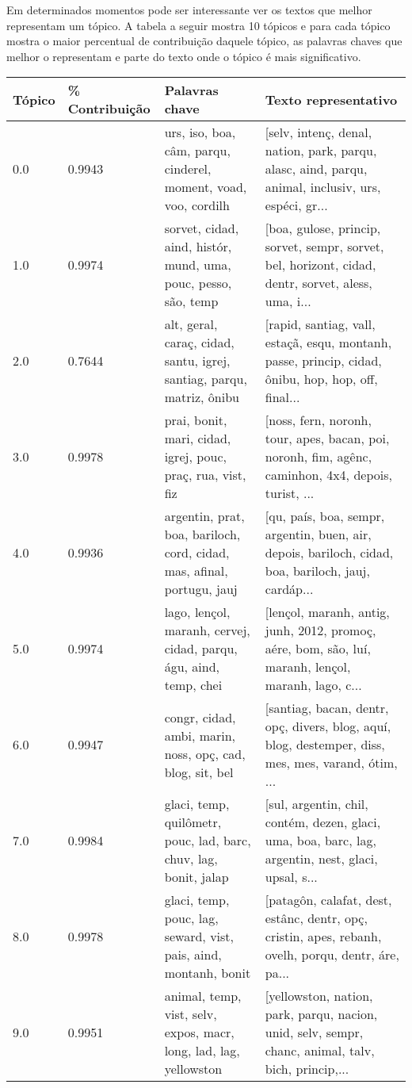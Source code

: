 Em determinados momentos pode ser interessante ver os textos que melhor representam um tópico. A tabela a seguir mostra 10 tópicos e para cada tópico 
mostra o maior percentual de contribuição daquele tópico, as palavras chaves que melhor o representam e parte do texto onde o tópico
é mais significativo.

\begin{center}
    \begin{tabular}{| m{5em} | m{6em} | m{10em} | m{10em} |}
        \hline
        Tópico & \% Contribuição & Palavras chave & Texto representativo \\
        \hline
        0.0 & 0.9943 & urs, iso, boa, câm, parqu, cinderel, moment, voad, voo, cordilh & [selv, intenç, denal, nation, park, parqu, alasc, aind, parqu, animal, inclusiv, urs, espéci, gr... \\
        \hline
        1.0 & 0.9974 & sorvet, cidad, aind, histór, mund, uma, pouc, pesso, são, temp & [boa, gulose, princip, sorvet, sempr, sorvet, bel, horizont, cidad, dentr, sorvet, aless, uma, i... \\
        \hline
        2.0 & 0.7644 & alt, geral, caraç, cidad, santu, igrej, santiag, parqu, matriz, ônibu & [rapid, santiag, vall, estaçã, esqu, montanh, passe, princip, cidad, ônibu, hop, hop, off, final... \\
        \hline
        3.0 & 0.9978 & prai, bonit, mari, cidad, igrej, pouc, praç, rua, vist, fiz & [noss, fern, noronh, tour, apes, bacan, poi, noronh, fim, agênc, caminhon, 4x4, depois, turist, ... \\
        \hline
        4.0 & 0.9936 & argentin, prat, boa, bariloch, cord, cidad, mas, afinal, portugu, jauj & [qu, país, boa, sempr, argentin, buen, air, depois, bariloch, cidad, boa, bariloch, jauj, cardáp... \\
        \hline
        5.0 & 0.9974 & lago, lençol, maranh, cervej, cidad, parqu, águ, aind, temp, chei & [lençol, maranh, antig, junh, 2012, promoç, aére, bom, são, luí, maranh, lençol, maranh, lago, c... \\
        \hline
        6.0 & 0.9947 & congr, cidad, ambi, marin, noss, opç, cad, blog, sit, bel & [santiag, bacan, dentr, opç, divers, blog, aquí, blog, destemper, diss, mes, mes, varand, ótim, ... \\
        \hline
        7.0 & 0.9984 & glaci, temp, quilômetr, pouc, lad, barc, chuv, lag, bonit, jalap & [sul, argentin, chil, contém, dezen, glaci, uma, boa, barc, lag, argentin, nest, glaci, upsal, s... \\
        \hline
        8.0 & 0.9978 & glaci, temp, pouc, lag, seward, vist, pais, aind, montanh, bonit & [patagôn, calafat, dest, estânc, dentr, opç, cristin, apes, rebanh, ovelh, porqu, dentr, áre, pa... \\
        \hline
        9.0 & 0.9951 & animal, temp, vist, selv, expos, macr, long, lad, lag, yellowston & [yellowston, nation, park, parqu, nacion, unid, selv, sempr, chanc, animal, talv, bich, princip,... \\
        \hline
    \end{tabular}
\end{center}
